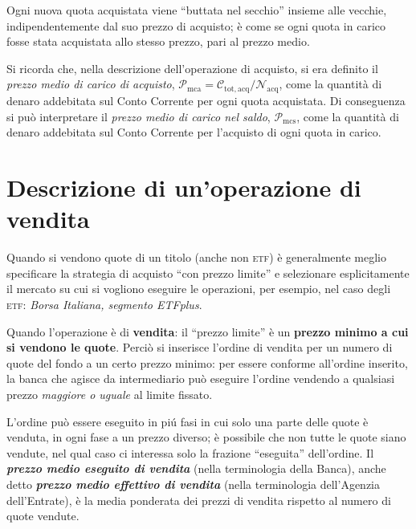 \documentclass[12pt,a4paper]{article}
\newcommand{\Undefine}[1]{\let#1\CustomUndefined}
\newcommand{\Define}[2]{%
\Undefine{#1}
\newcommand{#1}{#2}
}
\newcommand{\Parentesi}[1]{(#1)}
\newcommand{\Virgolette}[1]{``#1''}
\newcommand{\Etf}[1]{\textsc{etf}}
\newcommand{\Nacq}[1]{\mathcal{N}_{\textrm{acq}#1}}
\newcommand{\Pmc}[1]{\mathcal{P}_{\mathrm{mc}#1}}
\newcommand{\Pmca}[1]{\Pmc{\mathrm{a}#1}}
\newcommand{\Pmcs}[1]{\Pmc{\mathrm{s}#1}}
\newcommand{\Ctotacq}[1]{\mathcal{C}_{\mathrm{tot,acq}#1}}
\begin{document}
Ogni  nuova  quota   acquistata  viene  \Virgolette{buttata  nel  secchio}   insieme  alle  vecchie,
indipendentemente dal suo prezzo di acquisto; è come  se ogni quota in carico fosse stata acquistata
allo stesso prezzo, pari al prezzo medio.

Si ricorda che, nella descrizione dell'operazione di acquisto, si era definito il \emph{prezzo medio
   di carico di acquisto}, \(\Pmca{} = \Ctotacq{} / \Nacq{}\), come la quantità di denaro addebitata
sul Conto Corrente  per ogni quota acquistata.   Di conseguenza si può  interpretare il \emph{prezzo
   medio di carico nel saldo}, \(\Pmcs{}\), come la quantità di denaro addebitata sul Conto Corrente
per l'acquisto di ogni quota in carico.


\section{Descrizione di un'operazione di vendita}



\Define{\UnoNumeroQuote}{20}
\Define{\DueNumeroQuote}{30}
\Define{\TreNumeroQuote}{50}
\Define{\UnoPrezzoEseguito}{52,00}
\Define{\DuePrezzoEseguito}{53,00}
\Define{\TrePrezzoEseguito}{55,00}


Quando si vendono quote di un titolo  \Parentesi{anche non \Etf{}} è generalmente meglio specificare
la strategia di  acquisto \Virgolette{con prezzo limite} e selezionare  esplicitamente il mercato su
cui si vogliono  eseguire le operazioni, per  esempio, nel caso degli  \Etf{}: \emph{Borsa Italiana,
   segmento ETFplus}.

Quando l'operazione è di \textbf{vendita}: il  \Virgolette{prezzo limite} è un \textbf{prezzo minimo
   a cui si vendono le  quote}.  Perciò si inserisce l'ordine di vendita per  un numero di quote del
fondo a  un certo prezzo  minimo: per essere  conforme all'ordine inserito,  la banca che  agisce da
intermediario può eseguire  l'ordine vendendo a qualsiasi prezzo \emph{maggiore  o uguale} al limite
fissato.

L'ordine può essere eseguito in piú fasi in cui solo una parte delle quote è venduta, in ogni fase a
un prezzo diverso; è possibile che non tutte le quote siano vendute, nel qual caso ci interessa solo
la frazione \Virgolette{eseguita} dell'ordine.  Il  \textbf{\emph{prezzo medio eseguito di vendita}}
(nella  terminologia della  Banca), anche  detto \textbf{\emph{prezzo  medio effettivo  di vendita}}
(nella terminologia dell'Agenzia dell'Entrate), è la  media ponderata dei prezzi di vendita rispetto
al numero di quote vendute.
\end{document}
